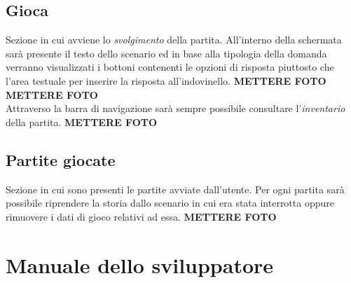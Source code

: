 \documentclass{article}
\begin{document}
\subsection*{Gioca}
Sezione in cui avviene lo \textit{svolgimento} della partita. All'interno della schermata sarà presente il testo dello scenario ed in base alla tipologia della domanda verranno visualizzati i bottoni contenenti le opzioni di risposta piuttosto che l'area testuale per inserire la risposta all'indovinello.
\textbf{METTERE FOTO}\vspace*{7pt}\\
\textbf{METTERE FOTO}\vspace*{7pt}\\
Attraverso la barra di navigazione sarà sempre possibile consultare l'\textit{inventario} della partita.
\textbf{METTERE FOTO}\vspace*{7pt}\\

\subsection*{Partite giocate}
Sezione in cui sono presenti le partite avviate dall'utente. Per ogni partita sarà possibile riprendere la storia dallo scenario in cui era stata interrotta oppure rimuovere i dati di gioco relativi ad essa.
\textbf{METTERE FOTO}\vspace*{7pt}\\

\clearpage
\section*{Manuale dello sviluppatore}
\end{document}
